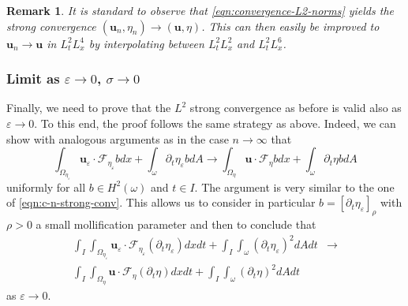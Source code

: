 \documentclass[10pt,a4paper]{article}
\newtheorem{remark}[theorem]{Remark}
\numberwithin{equation}{section}
\begin{document}
\begin{remark}
    It is standard to observe that \eqref{eqn:convergence-L2-norms} yields the \emph{strong} convergence $\left(\mathbf{u}_{n},\eta_{n}\right)\to\left(\mathbf{u},\eta\right)$. This can then easily be  improved   to $\mathbf{u}_{n}\to\mathbf{u}$ in $L^2_{t} L^{4}_{x}$ by interpolating between $L^{2}_{t}L^{2}_{x}$ and $L^{2}_{t}L^{6}_{x}$.
\end{remark}
\subsubsection{Limit as \texorpdfstring{$\varepsilon \to 0$, $\sigma \to 0$}{epsilon, sigma to 0}}\label{subsubsection-compactness2-plate}
Finally, we need to prove that the $L^2$ strong convergence as before is valid also as $\varepsilon\to 0$. To this end, the proof follows the same strategy as above.
Indeed, we can show with analogous arguments as in the case $n\to\infty$ that 
\begin{equation}
\int_{\Omega_{\eta_{\varepsilon}}}\mathbf{u}_{\varepsilon}\cdot\mathcal{F}_{\eta_{\varepsilon}}bdx+\int_{\omega}\partial_{t}\eta_{\varepsilon}bdA\to\int_{\Omega_{\eta}}\mathbf{u}\cdot\mathcal{F}_{\eta}bdx+\int_{\omega}\partial_{t}\eta bdA
\end{equation}
uniformly for all $b\in H^{2}\left(\omega\right)$ and $t\in I$.
The argument is very similar to the one of \eqref{eqn:c-n-strong-conv}.
This allows us to consider in particular $b=\left[\partial_{t}\eta_{\varepsilon}\right]_{\rho}$ with $\rho>0$ a small mollification parameter and then to conclude that 
\begin{equation}\label{eqn:complact-eps-1}
\begin{aligned}\int_{I}\int_{\Omega_{\eta_{\varepsilon}}}\mathbf{u}_{\varepsilon}\cdot\mathcal{F}_{\eta_{\varepsilon}}\left(\partial_{t}\eta_{\varepsilon}\right)dxdt+\int_{I}\int_{\omega}\left(\partial_{t}\eta_{\varepsilon}\right)^{2}dAdt & \to\\
\int_{I}\int_{\Omega_{\eta}}\mathbf{u}\cdot\mathcal{F}_{\eta}\left(\partial_{t}\eta\right)dxdt+\int_{I}\int_{\omega}\left(\partial_{t}\eta\right)^{2}dAdt
\end{aligned}
\end{equation}  as $\varepsilon\to 0$.
\end{document}
